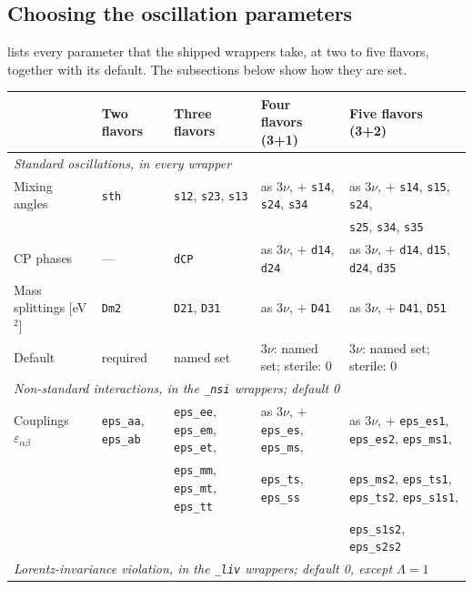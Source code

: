 \subsection{Choosing the oscillation parameters}
\label{sec:params}

 lists every parameter that the shipped wrappers take, at two to five flavors, together with its default. The subsections below show how they are set.


\begin{table}[t!]
\centering
\footnotesize
\renewcommand{\arraystretch}{1.15}
\begin{tabular}{l l l l l}
 & \textbf{Two flavors} & \textbf{Three flavors} & \textbf{Four flavors (3+1)} & \textbf{Five flavors (3+2)} \\
\hline
\multicolumn{5}{l}{\emph{Standard oscillations, in every wrapper}} \\
Mixing angles & {\tt sth} & {\tt s12}, {\tt s23}, {\tt s13} & as 3$\nu$, $+$ {\tt s14}, {\tt s24}, {\tt s34} & as 3$\nu$, $+$ {\tt s14}, {\tt s15}, {\tt s24}, \\
 & & & & {\tt s25}, {\tt s34}, {\tt s35} \\
CP phases & --- & {\tt dCP} & as 3$\nu$, $+$ {\tt d14}, {\tt d24} & as 3$\nu$, $+$ {\tt d14}, {\tt d15}, {\tt d24}, {\tt d35} \\
Mass splittings [eV$^2$] & {\tt Dm2} & {\tt D21}, {\tt D31} & as 3$\nu$, $+$ {\tt D41} & as 3$\nu$, $+$ {\tt D41}, {\tt D51} \\
Default & required & named set & 3$\nu$: named set; sterile: 0 & 3$\nu$: named set; sterile: 0 \\
\hline
\multicolumn{5}{l}{\emph{Non-standard interactions, in the {\tt \_nsi} wrappers; default 0}} \\
Couplings $\varepsilon_{\alpha\beta}$ & {\tt eps\_aa}, {\tt eps\_ab} & {\tt eps\_ee}, {\tt eps\_em}, {\tt eps\_et}, & as 3$\nu$, $+$ {\tt eps\_es}, {\tt eps\_ms}, & as 3$\nu$, $+$ {\tt eps\_es1}, {\tt eps\_es2}, {\tt eps\_ms1}, \\
 & & {\tt eps\_mm}, {\tt eps\_mt}, {\tt eps\_tt} & {\tt eps\_ts}, {\tt eps\_ss} & {\tt eps\_ms2}, {\tt eps\_ts1}, {\tt eps\_ts2}, {\tt eps\_s1s1}, \\
 & & & & {\tt eps\_s1s2}, {\tt eps\_s2s2} \\
\hline
\multicolumn{5}{l}{\emph{Lorentz-invariance violation, in the {\tt \_liv} wrappers; default 0, except $\Lambda = 1$}} \\

\end{tabular}
\end{table}
